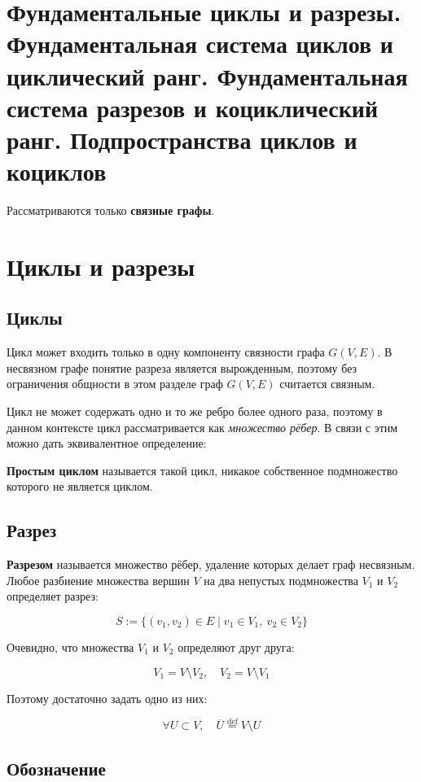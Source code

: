 {
	\section{Фундаментальные циклы и разрезы. Фундаментальная система циклов и
циклический ранг. Фундаментальная система разрезов и коциклический ранг.
Подпространства циклов и коциклов}
Рассматриваются только \textbf{связные графы}.


\section*{Циклы и разрезы}

\subsection*{Циклы}

Цикл может входить только в одну компоненту связности графа $G(V, E)$.  
В несвязном графе понятие разреза является вырожденным, поэтому без ограничения общности в этом разделе граф $G(V, E)$ считается связным.

Цикл не может содержать одно и то же ребро более одного раза, поэтому в данном контексте цикл рассматривается как \emph{множество рёбер}.  
В связи с этим можно дать эквивалентное определение:

\textbf{Простым циклом} называется такой цикл, никакое собственное подмножество которого не является циклом.


\subsection*{Разрез}

\textbf{Разрезом} называется множество рёбер, удаление которых делает граф несвязным.  
Любое разбиение множества вершин $V$ на два непустых подмножества $V_1$ и $V_2$ определяет разрез:


\[
S := \{(v_1, v_2) \in E \mid v_1 \in V_1,\ v_2 \in V_2\}
\]



Очевидно, что множества $V_1$ и $V_2$ определяют друг друга:


\[
V_1 = V \setminus V_2,\quad V_2 = V \setminus V_1
\]


Поэтому достаточно задать одно из них:


\[
\forall U \subset V,\quad \overline{U} \overset{\text{def}}{=} V \setminus U
\]



\subsection*{Обозначение}

}
